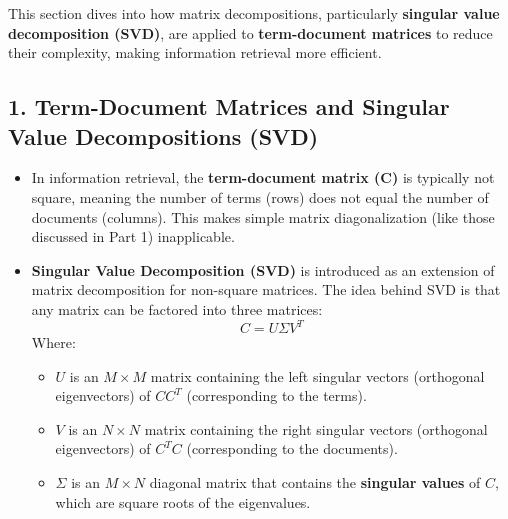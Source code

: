 \documentclass{article}
\begin{document}
This section dives into how matrix decompositions, particularly \textbf{singular value decomposition (SVD)}, are applied to \textbf{term-document matrices} to reduce their complexity, making information retrieval more efficient.

\subsection*{1. Term-Document Matrices and Singular Value Decompositions (SVD)}
\begin{itemize}
    \item In information retrieval, the \textbf{term-document matrix (C)} is typically not square, meaning the number of terms (rows) does not equal the number of documents (columns). This makes simple matrix diagonalization (like those discussed in Part 1) inapplicable.
    \item \textbf{Singular Value Decomposition (SVD)} is introduced as an extension of matrix decomposition for non-square matrices. The idea behind SVD is that any matrix can be factored into three matrices:
    \[
    C = U \Sigma V^T
    \]
    Where:
    \begin{itemize}
        \item \textbf{\( U \)} is an \( M \times M \) matrix containing the left singular vectors (orthogonal eigenvectors) of \( CC^T \) (corresponding to the terms).
        \item \textbf{\( V \)} is an \( N \times N \) matrix containing the right singular vectors (orthogonal eigenvectors) of \( C^T C \) (corresponding to the documents).
        \item \textbf{\( \Sigma \)} is an \( M \times N \) diagonal matrix that contains the \textbf{singular values} of \( C \), which are square roots of the eigenvalues.
    \end{itemize}
\end{itemize}
\end{document}
